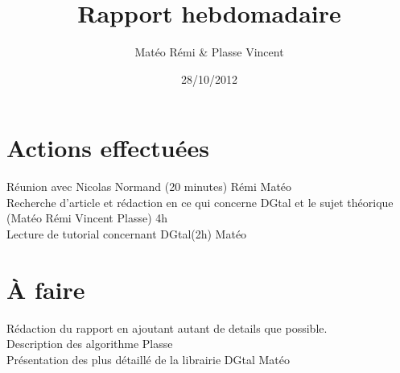 \documentclass{article}
\title{Rapport hebdomadaire}
\author{Matéo Rémi \& Plasse Vincent}
\date{28/10/2012}
\begin{document}
\maketitle

\section{Actions effectuées}
Réunion  avec Nicolas Normand (20 minutes) Rémi Matéo \\
Recherche d'article et rédaction en ce qui concerne DGtal et le sujet théorique (Matéo Rémi Vincent Plasse) 4h \\
Lecture de tutorial concernant DGtal(2h) Matéo  \\



\section{À faire}
Rédaction du rapport en ajoutant autant de details que possible. \\
Description des algorithme Plasse \\
Présentation des plus détaillé de la librairie DGtal Matéo \\
\end{document}
